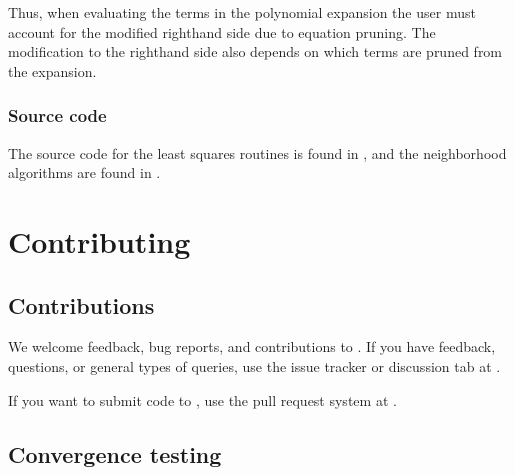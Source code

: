 \documentclass[letterpaper,10pt,english]{sphinxmanual}
\begin{document}
\sphinxAtStartPar
Thus, when evaluating the terms in the polynomial expansion the user must account for the modified right\sphinxhyphen{}hand side due to equation pruning.
The modification to the right\sphinxhyphen{}hand side also depends on which terms are pruned from the expansion.


\subsection{Source code}
\label{\detokenize{Utilities/LeastSquares:source-code}}
\sphinxAtStartPar
The source code for the least squares routines is found in , and the neighborhood algorithms are found in .


\chapter{Contributing}
\label{\detokenize{index:contributing}}
\sphinxstepscope


\section{Contributions}
\label{\detokenize{Contrib/Contributions:contributions}}\label{\detokenize{Contrib/Contributions:chap-contributions}}\label{\detokenize{Contrib/Contributions::doc}}
\sphinxAtStartPar
We welcome feedback, bug reports, and contributions to .
If you have feedback, questions, or general types of queries, use the issue tracker or discussion tab at .

\sphinxAtStartPar
If you want to submit code to , use the pull request system at .

\sphinxstepscope


\section{Convergence testing}
\label{\detokenize{Contrib/Convergence:convergence-testing}}\label{\detokenize{Contrib/Convergence:chap-convergence}}\label{\detokenize{Contrib/Convergence::doc}}
\sphinxstepscope
\end{document}
